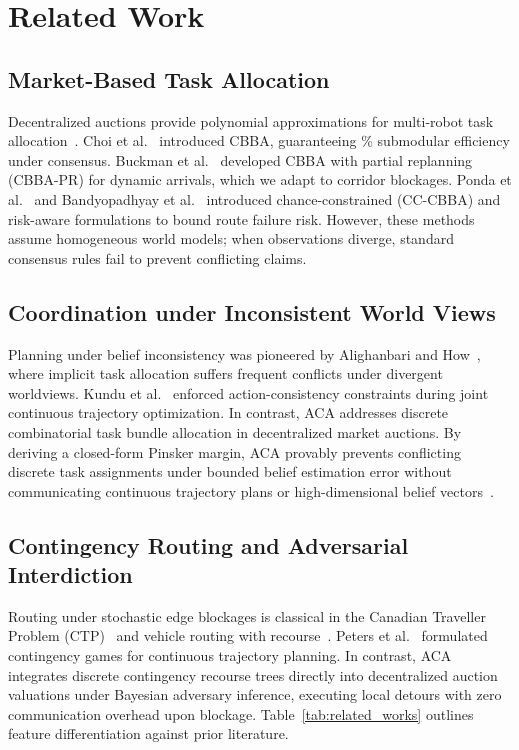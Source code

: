 \documentclass[lettersize,journal]{IEEEtran}
\begin{document}
\section{Related Work}
\subsection{Market-Based Task Allocation}
Decentralized auctions provide polynomial approximations for multi-robot task allocation~\cite{choi2009cbba, koenig2006ssi, bai2023group, johnson2012asynchronous, tovey2005geometry, luo2014provably, williams2017decentralized}. Choi et al.~\cite{choi2009cbba} introduced CBBA, guaranteeing \aeCbbaEfficiencyBound\% submodular efficiency under consensus. Buckman et al.~\cite{buckman2019partial} developed CBBA with partial replanning (CBBA-PR) for dynamic arrivals, which we adapt to corridor blockages. Ponda et al.~\cite{ponda2012cc} and Bandyopadhyay et al.~\cite{bandyopadhyay2017risk} introduced chance-constrained (CC-CBBA) and risk-aware formulations to bound route failure risk. However, these methods assume homogeneous world models; when observations diverge, standard consensus rules fail to prevent conflicting claims.

\subsection{Coordination under Inconsistent World Views}
Planning under belief inconsistency was pioneered by Alighanbari and How~\cite{alighanbari2005implicit}, where implicit task allocation suffers frequent conflicts under divergent worldviews. Kundu et al.~\cite{kundu2024multi} enforced action-consistency constraints during joint continuous trajectory optimization. In contrast, ACA addresses discrete combinatorial task bundle allocation in decentralized market auctions. By deriving a closed-form Pinsker margin, ACA provably prevents conflicting discrete task assignments under bounded belief estimation error without communicating continuous trajectory plans or high-dimensional belief vectors~\cite{ghadimi2014multi, olfatisaber2007consensus, albrecht2018reasoning}.

\subsection{Contingency Routing and Adversarial Interdiction}
Routing under stochastic edge blockages is classical in the Canadian Traveller Problem (CTP)~\cite{papadimitriou1991shortest, eyerich2010high, nikolova2008route} and vehicle routing with recourse~\cite{bertsimas1996new, wood1993deterministic, agmon2011multi}. Peters et al.~\cite{peters2024contingency} formulated contingency games for continuous trajectory planning. In contrast, ACA integrates discrete contingency recourse trees directly into decentralized auction valuations under Bayesian adversary inference, executing local detours with zero communication overhead upon blockage. Table~\ref{tab:related_works} outlines feature differentiation against prior literature.
\end{document}
